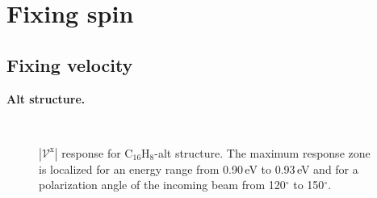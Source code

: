 \documentclass[prb,11pt,tightenlines,twocolumn,aps]{revtex4-1}
\begin{document}

\section{Fixing spin} %
\label{sec:res-fixspin}



\subsection{Fixing velocity} %
\label{sec:res-fixvel}

\textbf{Alt structure.}

\begin{figure}[tb]
    \centering
    \\
    \caption{$|\mathcal{V}^{\mathrm{x}}|$ response for C$_{16}$H$_{8}$-alt
    structure. The maximum response zone is localized for an energy range from
    0.90\,eV to 0.93\,eV and for a polarization angle of the
    incoming beam from 120$^{\circ}$ to 150$^{\circ}$.}
    \label{fig:alt-3d}
\end{figure}
\end{document}
